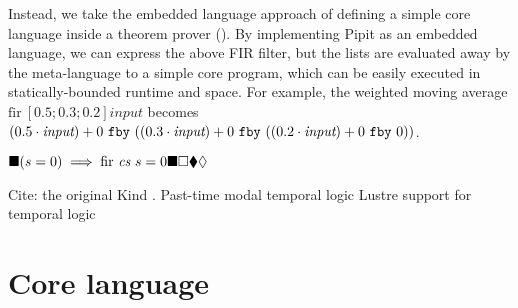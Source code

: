 \documentclass[sigplan,screen]{acmart}
\begin{document}
\newcommand\ii{\textit{input}}

Instead, we take the embedded language approach of defining a simple core language inside a theorem prover (\fstar{}).
By implementing Pipit as an embedded language, we can express the above FIR filter, but the lists are evaluated away by the meta-language to a simple core program, which can be easily executed in statically-bounded runtime and space.
For example, the weighted moving average $\mbox{fir}~[0.5; 0.3; 0.2] \ii$ becomes $(0.5 \cdot \ii) + \xfby{0}{((0.3 \cdot \ii) + \xfby{0}{((0.2 \cdot \ii) + \xfby{0}{0})})}$.


$\blacksquare(s = 0) \implies \mbox{fir~} \textit{cs}~s = 0 \blacksquare \Box \blacklozenge \Diamond$



Cite: the original Kind \cite{hagen2008scaling}.
Past-time modal temporal logic \cite{lichtenstein1985glory}
Lustre support for temporal logic \cite{halbwachs1993executable}

\section{Core language}
\label{s:core}




\end{document}
